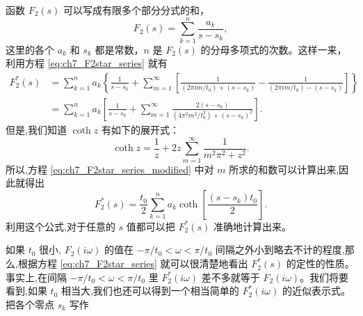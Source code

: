 函数 $F_2(s)$ 可以写成有限多个部分分式的和，
\begin{equation}\label{eq:ch7_F2_partial_frac}
F_2(s) = \sum_{k=1}^{n} \frac{a_k}{s-s_k},
\end{equation}
这里的各个 $a_k$ 和 $s_k$ 都是常数，$n$ 是 $F_2(s)$ 的分母多项式的次数。这样一来，利用方程 \eqref{eq:ch7_F2star_series} 就有
\begin{equation}\label{eq:ch7_F2star_series_modified}
\begin{array}{ll}
F_2^*(s) &= \sum_{k=1}^{n} a_k \left\{ \frac{1}{s-s_k} + \sum_{m=1}^{\infty} \left[ \frac{1}{(2\pi im/t_0) + (s-s_k)} - \frac{1}{(2\pi im/t_0) - (s-s_k)} \right] \right\}\\
&= \sum_{k=1}^{n} a_k \left[ \frac{1}{s-s_k} + \sum_{m=1}^{\infty} \frac{2(s-s_k)}{(4\pi^2 m^2 / t_0^2) + (s-s_k)^2} \right].
\end{array}
\end{equation}
但是,我们知道 $\coth z$ 有如下的展开式：
\begin{equation*}
\coth z = \frac{1}{z} + 2z \sum_{m=1}^{\infty} \frac{1}{m^2 \pi^2 + z^2}.
\end{equation*}
所以,方程 \eqref{eq:ch7_F2star_series_modified} 中对 $m$ 所求的和数可以计算出来,因此就得出
\begin{equation}\label{eq:ch7_F2star_coth}
F_2^*(s) = \frac{t_0}{2} \sum_{k=1}^{n} a_k \coth \left[ \frac{(s-s_k)t_0}{2} \right].
\end{equation}
利用这个公式,对于任意的 $s$ 值都可以把 $F_2^*(s)$ 准确地计算出来。

如果 $t_0$ 很小, $F_2(i\omega)$ 的值在 $-\pi / t_0 < \omega < \pi / t_0$ 间隔之外小到略去不计的程度,那么,根据方程 \eqref{eq:ch7_F2star_series} 就可以很清楚地看出 $F_2^*(s)$ 的定性的性质。事实上,在间隔 $-\pi / t_0 < \omega < \pi / t_0$ 里 $F_2^*(i\omega)$ 差不多就等于 $F_2(i\omega)$。我们将要看到,如果 $t_0$ 相当大,我们也还可以得到一个相当简单的 $F_2^*(i\omega)$ 的近似表示式。把各个零点 $s_k$ 写作

